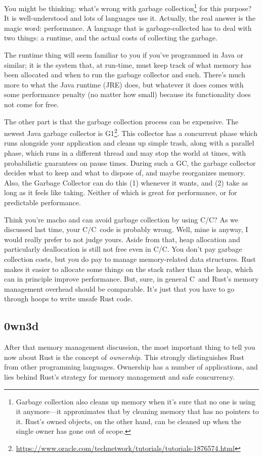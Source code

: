 \documentclass[a4paper]{report}
\newcommand{\CPP}{C\nolinebreak\hspace{-.05em}\raisebox{.4ex}{\tiny\bf +}\nolinebreak\hspace{-.10em}\raisebox{.4ex}{\tiny\bf +}}
\def\CPP{{C\nolinebreak[4]\hspace{-.05em}\raisebox{.4ex}{\tiny\bf ++}}}
\begin{document}
You might be thinking: what's wrong with garbage collection\footnote{Garbage collection also cleans up memory when it's sure that no one is using it anymore---it approximates that by cleaning memory that has no pointers to it. Rust's owned objects, on the other hand, can be cleaned up when the single owner has gone out of scope.} for this purpose? It is well-understood and lots of languages use it. Actually, the real answer is the magic word: performance. A language that is garbage-collected has to deal with two things: a runtime, and the actual costs of collecting the garbage.

The runtime thing will seem familiar to you if you've programmed in Java or similar; it is the system that, at run-time, must keep track of what memory has been allocated and when to run the garbage collector and such. There's much more to what the Java runtime (JRE) does, but whatever it does comes with some performance penalty (no matter how small) because its functionality does not come for free. 

The other part is that the garbage collection process can be expensive. The newest Java garbage collector is G1\footnote{\url{https://www.oracle.com/technetwork/tutorials/tutorials-1876574.html}}. This collector has a concurrent phase which runs alongside your application and cleans up simple trash, along with a parallel phase, which runs in a different thread and may stop the world at times, with probabilistic guarantees on pause times. During such a GC, the garbage collector decides what to keep and what to dispose of, and maybe reorganizes memory.  Also, the Garbage Collector can do this (1) whenever it wants, and (2) take as long as it feels like taking. Neither of which is great for performance, or for predictable performance.

Think you're macho and can avoid garbage collection by using C/\CPP? As we discussed last time, your C/\CPP~code is probably wrong. Well, mine is anyway, I would really prefer to not judge yours. Aside from that, heap allocation and particularly deallocation is still not free even in C/\CPP. You don't pay garbage collection costs, but you do pay to manage memory-related data structures. Rust makes it easier to allocate some things on the stack rather than the heap, which can in principle improve performance. But, sure, in general \CPP~and Rust's memory management overhead should be comparable. It's just that you have to go through hoops to write unsafe Rust code.

\subsection*{0wn3d} After that memory management discussion, the most important thing to tell you now about Rust is the concept of \textit{ownership}. This strongly distinguishes Rust from other programming languages. Ownership has a number of applications, and lies behind Rust's strategy for memory management and safe concurrency.
\end{document}
